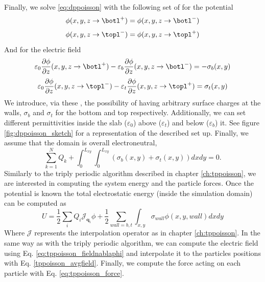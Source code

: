 \documentclass[ twoside,openright,titlepage,numbers=noenddot,%
headinclude,footinclude,cleardoublepage=empty,abstract=on,
BCOR=5mm,paper=b5,fontsize=11pt, dvipsnames
]{scrreprt}
\renewcommand{\vec}[1]{\bm{#1}}
\newcommand{\oper}[1]{\mathcal{#1}}
\begin{document}
Finally, we solve \eqref{eq:dppoisson} with the following set of \bcs for the potential
\begin{equation}\phi(x,y,z\rightarrow \botl^+)=\phi(x,y,z\rightarrow \botl^-)\label{eq:dppoissonbcs1}\end{equation}  
\begin{equation}\phi(x,y,z\rightarrow \topl^-)=\phi(x,y,z\rightarrow \topl^+)\label{eq:dppoissonbcs2}\end{equation}
And for the electric field 
\begin{equation}\varepsilon_0 \frac{\partial \phi}{\partial z}(x,y,z\rightarrow \botl^+)-\varepsilon_b \frac{\partial \phi}{\partial z}(x,y,z\rightarrow \botl^-)=-\sigma_b(x,y)\label{eq:dppoissonbcs3}\end{equation}  
\begin{equation}\varepsilon_0 \frac{\partial \phi}{\partial z}(x,y,z\rightarrow \topl^-)-\varepsilon_t \frac{\partial \phi}{\partial z}(x,y,z\rightarrow \topl^+)=\sigma_t(x,y)\label{eq:dppoissonbcs4}\end{equation} 
We introduce, via these \bcs, the possibility of having arbitrary surface charges at the walls, $\sigma_b$ and $\sigma_t$ for the bottom and top respectively. Additionally, we can set different permittivities inside the slab ($\varepsilon_0$) above ($\varepsilon_t$) and below ($\varepsilon_b$) it. See figure \ref{fig:dppoisson_sketch} for a representation of the described set up.
Finally, we assume that the domain is overall electroneutral,
\begin{equation}
  \label{eq:dppoisson_electroneutral}
  \sum_{k=1}^N{Q_k} + \int_0^{L_{xy}}{\int_0^{L_{xy}}{(\sigma_b(x,y) + \sigma_t(x,y))dx dy}} = 0.
\end{equation}
Similarly to the triply periodic algorithm described in chapter \ref{ch:tppoisson}, we are interested in computing the system energy and the particle forces.
Once the potential is known the total electrostatic energy (inside the simulation domain) can be computed as
\begin{equation}
  \label{eq:dppu}
  U = \frac{1}{2}\sum_i{Q_i\oper{J}_{\vec{q}_i}\phi} + \frac{1}{2}\sum_{wall=b,t}{\int_{x,y}{\sigma_{wall}\phi(x,y,wall)dx dy}}
\end{equation}
Where $\oper{J}$ represents the interpolation operator as in chapter \ref{ch:tppoisson}.
In the same way as with the triply periodic algorithm, we can compute the electric field using Eq. \eqref{eq:tppoisson_fieldnablaphi} and interpolate it to the particles positions with Eq. \eqref{tppoisson_avgfield}. Finally, we compute the force acting on each particle with Eq. \eqref{eq:tppoisson_force}.
\end{document}
